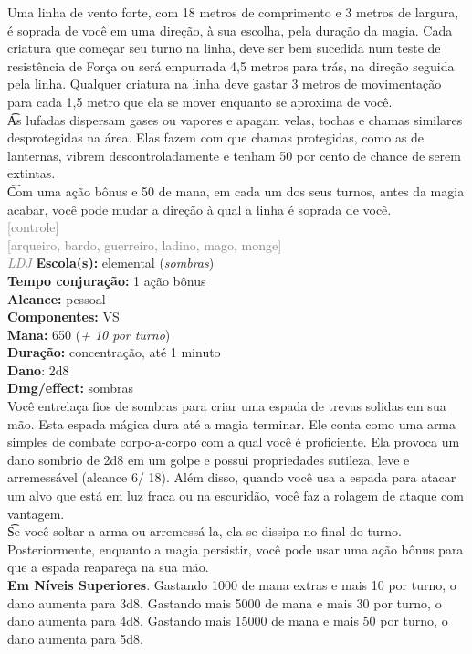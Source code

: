 \documentclass{RPG_Adventure}[2021/10/20]
\begin{document}
{\normalsize Uma linha de vento forte, com 18 metros de comprimento e 3 metros de largura, é soprada de você em uma direção, à sua escolha, pela duração da magia. Cada criatura que começar seu turno na linha, deve ser bem sucedida num teste de resistência de Força ou será empurrada 4,5 metros para trás, na direção seguida pela linha. Qualquer criatura na linha deve gastar 3 metros de movimentação para cada 1,5 metro que ela se mover enquanto se aproxima de você.\\\t As lufadas dispersam gases ou vapores e apagam velas, tochas e chamas similares desprotegidas na área. Elas fazem com que chamas protegidas, como as de lanternas, vibrem descontroladamente e tenham 50 por cento de chance de serem extintas.\\\t Com uma ação bônus e 50 de mana, em cada um dos seus turnos, antes da magia acabar, você pode mudar a direção à qual a linha é soprada de você.\\}
{\scriptsize \textcolor{gray}{[controle]\\}}
{\scriptsize \textcolor{gray}{[arqueiro, bardo, guerreiro, ladino, mago, monge]\\}}
{\tiny \textcolor{gray}{\textit{LDJ}}}\jump{}
{\small \t \textbf{Escola(s):} elemental (\textit{sombras})\\\t \textbf{Tempo conjuração:} 1 ação bônus\\\t \textbf{Alcance:} pessoal\\\t \textbf{Componentes:} VS\\\t \textbf{Mana:} 650 (\textit{+ 10 por turno})\\\t \textbf{Duração:} concentração, até 1 minuto\\\t \textbf{Dano}: 2d8\\\t \textbf{Dmg/effect:} sombras\\}
{\normalsize Você entrelaça fios de sombras para criar uma espada de trevas solidas em sua mão. Esta espada mágica dura até a magia terminar. Ele conta como uma arma simples de combate corpo-a-corpo com a qual você é proficiente. Ela provoca um dano sombrio de 2d8 em um golpe e possui propriedades sutileza, leve e arremessável (alcance 6/ 18). Além disso, quando você usa a espada para atacar um alvo que está em luz fraca ou na escuridão, você faz a rolagem de ataque com vantagem.\\\t Se você soltar a arma ou arremessá-la, ela se dissipa no final do turno. Posteriormente, enquanto a magia persistir, você pode usar uma ação bônus para que a espada reapareça na sua mão.\\\t \textbf{Em Níveis Superiores}. Gastando 1000 de mana extras e mais 10 por turno, o dano aumenta para 3d8. Gastando mais 5000 de mana e mais 30 por turno, o dano aumenta para 4d8. Gastando mais 15000 de mana e mais 50 por turno, o dano aumenta para 5d8.\\}
\end{document}
